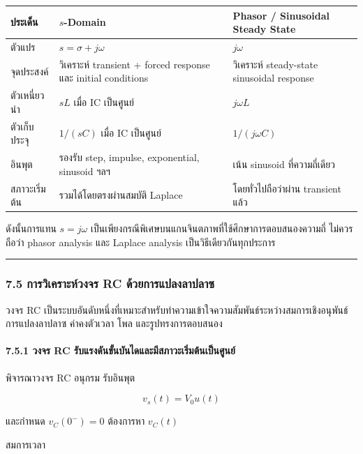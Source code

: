 \begin{table}[htbp]
    \centering
    \small
    \begin{tabularx}{\textwidth}{L{0.19\textwidth} L{0.35\textwidth} Y}
        \hline
        \textbf{ประเด็น} & \textbf{$s$-Domain} & \textbf{Phasor / Sinusoidal Steady State} \\
        \hline
        ตัวแปร & $s=\sigma+j\omega$ & $j\omega$ \\
        จุดประสงค์ & วิเคราะห์ transient + forced response และ initial conditions & วิเคราะห์ steady-state sinusoidal response \\
        ตัวเหนี่ยวนำ & $sL$ เมื่อ IC เป็นศูนย์ & $j\omega L$ \\
        ตัวเก็บประจุ & $1/(sC)$ เมื่อ IC เป็นศูนย์ & $1/(j\omega C)$ \\
        อินพุต & รองรับ step, impulse, exponential, sinusoid ฯลฯ & เน้น sinusoid ที่ความถี่เดียว \\
        สภาวะเริ่มต้น & รวมได้โดยตรงผ่านสมบัติ Laplace & โดยทั่วไปถือว่าผ่าน transient แล้ว \\
        \hline
    \end{tabularx}
\end{table}

ดังนั้นการแทน $s=j\omega$ เป็นเพียงกรณีพิเศษบนแกนจินตภาพที่ใช้ศึกษาการตอบสนองความถี่ ไม่ควรถือว่า phasor analysis และ Laplace analysis เป็นวิธีเดียวกันทุกประการ

\par\noindent\rule{\textwidth}{0.4pt}\par

\subsubsection{7.5 การวิเคราะห์วงจร RC ด้วยการแปลงลาปลาซ}

วงจร RC เป็นระบบอันดับหนึ่งที่เหมาะสำหรับทำความเข้าใจความสัมพันธ์ระหว่างสมการเชิงอนุพันธ์ การแปลงลาปลาซ ค่าคงตัวเวลา โพล และรูปทรงการตอบสนอง

\paragraph{7.5.1 วงจร RC รับแรงดันขั้นบันไดและมีสภาวะเริ่มต้นเป็นศูนย์}

พิจารณาวงจร RC อนุกรม รับอินพุต

\[
v_s(t)=V_0u(t)
\]

และกำหนด $v_C(0^-)=0$ ต้องการหา $v_C(t)$

สมการเวลา


